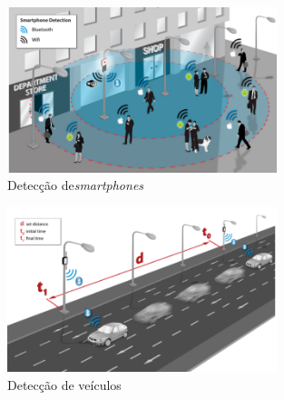 \begin{figure}[htb]
  \caption{\label{meshlium-celulares}Detecção de\emph{smartphones}}
  \begin{center}
    \includegraphics[width=0.70\textwidth]{img/meshlium-celulares.png}
  \end{center}
\end{figure}

\begin{figure}[htb]
  \caption{\label{meshlium-carros}Detecção de veículos}
  \begin{center}
    \includegraphics[width=0.70\textwidth]{img/meshlium-carros.png}
  \end{center}
\end{figure}
